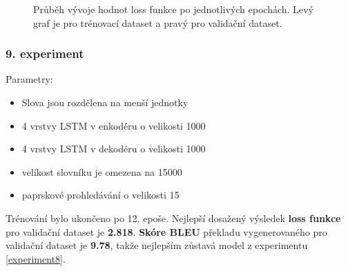 \begin{figure}[H]
    \begin{center}
    \end{center}
	\caption{Průběh vývoje hodnot loss funkce po jednotlivých epochách. Levý graf je pro trénovací dataset a pravý pro validační dataset.}
\end{figure}

\subsubsection{9. experiment}\label{experiment9}
Parametry:
\begin{itemize}
  \item Slova jsou rozdělena na menší jednotky
  \item 4 vrstvy LSTM v enkodéru o velikosti 1000
  \item 4 vrstvy LSTM v dekodéru o velikosti 1000
  \item velikost slovníku je omezena na 15000
  \item paprskové prohledávání o velikosti 15
\end{itemize}

Trénování bylo ukončeno po 12. epoše. Nejlepší dosažený výsledek \textbf{loss funkce} pro validační dataset je \textbf{2.818}. \textbf{Skóre BLEU} překladu vygenerovaného pro validační dataset je \textbf{9.78}, takže nejlepším zůstavá model z experimentu \ref{experiment8}.

